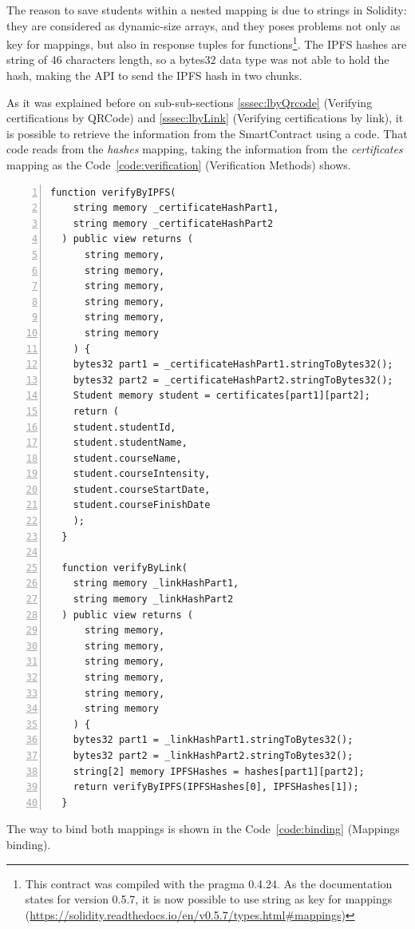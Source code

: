 \documentclass[runningheads]{llncs}
\begin{document}
The reason to save students within a nested mapping is due to strings in Solidity: they are considered as dynamic-size arrays, and they poses problems not only as key for mappings, but also in response tuples for functions\footnote{This contract was compiled with the pragma 0.4.24. As the documentation states for version 0.5.7, it is now possible to use string as key for mappings (\url{https://solidity.readthedocs.io/en/v0.5.7/types.html\#mappings})}. The IPFS hashes are string of 46 characters length, so a bytes32 data type was not able to hold the hash, making the API to send the IPFS hash in two chunks.

As it was explained before on sub-sub-sections \ref{sssec:lbyQrcode} (Verifying certifications by QRCode) and \ref{sssec:lbyLink} (Verifying certifications by link), it is possible to retrieve the information from the SmartContract using a code. That code reads from the \emph{hashes} mapping, taking the information from the \emph{certificates} mapping as the Code~\ref{code:verification} (Verification Methods) shows.

\begin{Verbatim}[frame=single,numbers=left,label=Verification Methods]
function verifyByIPFS(
    string memory _certificateHashPart1,
    string memory _certificateHashPart2
  ) public view returns (
      string memory,
      string memory,
      string memory,
      string memory, 
      string memory, 
      string memory
    ) {
    bytes32 part1 = _certificateHashPart1.stringToBytes32();
    bytes32 part2 = _certificateHashPart2.stringToBytes32();
    Student memory student = certificates[part1][part2];
    return (
    student.studentId,
    student.studentName,
    student.courseName,
    student.courseIntensity,
    student.courseStartDate,
    student.courseFinishDate
    );
  }

  function verifyByLink(
    string memory _linkHashPart1,
    string memory _linkHashPart2
  ) public view returns (
      string memory,
      string memory, 
      string memory,
      string memory, 
      string memory, 
      string memory
    ) {
    bytes32 part1 = _linkHashPart1.stringToBytes32();
    bytes32 part2 = _linkHashPart2.stringToBytes32();
    string[2] memory IPFSHashes = hashes[part1][part2];
    return verifyByIPFS(IPFSHashes[0], IPFSHashes[1]);
  }
\end{Verbatim}
\label{code:verification}

The way to bind both mappings is shown in the Code~\ref{code:binding} (Mappings binding).
\end{document}
